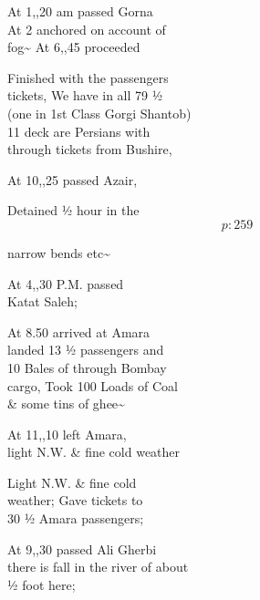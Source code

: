 \documentclass{report}
\begin{document}
	\par{
 	At 1,,20 am passed Gorna\ \\At 2 anchored on account of\ \\fog\~{} At 6,,45 proceeded\ \\
	}

	\par{
 	Finished with the passengers\ \\tickets, We have in all 79 ½\ \\(one in 1st Class Gorgi Shantob)\ \\11 deck are Persians with\ \\through tickets from Bushire,\ \\
	}

	\par{
 	At 10,,25 passed Azair,\ \\
	}

	\par{
 	Detained ½ hour in the\ \\
  \[p: 259 \]

	}



	\par{
 	narrow bends etc\~{}\ \\
	}

	\par{
 	At 4,,30 P.M. passed\ \\Katat Saleh;\ \\
	}

	\par{
 	At 8.50 arrived at Amara\ \\landed 13 ½ passengers and\ \\10 Bales of through Bombay\ \\cargo, Took 100 Loads of Coal\ \\\& some tins of ghee\~{}\ \\
	}

	\par{
 	At 11,,10 left Amara,\ \\light N.W. \& fine cold weather\ \\
	}

	\par{
 	Light N.W. \& fine cold\ \\weather; Gave tickets to\ \\30 ½ Amara passengers;\ \\
	}

	\par{
 	At 9,,30 passed Ali Gherbi\ \\there is fall in the river of about\ \\½ foot here;\ \\
	}
\end{document}
